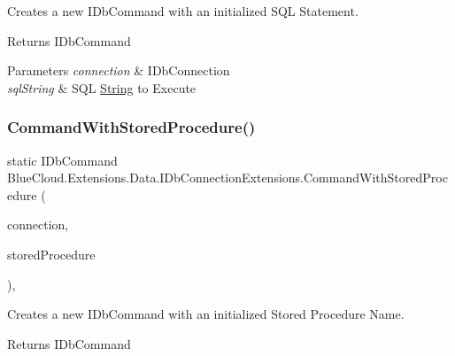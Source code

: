 Creates a new I\+Db\+Command with an initialized S\+QL Statement. 

\begin{DoxyReturn}{Returns}
I\+Db\+Command
\end{DoxyReturn}

\begin{DoxyParams}{Parameters}
{\em connection} & I\+Db\+Connection\\
\hline
{\em sql\+String} & S\+QL \mbox{\hyperlink{namespace_blue_cloud_1_1_extensions_1_1_string}{String}} to Execute\\
\hline
\end{DoxyParams}
\mbox{\label{class_blue_cloud_1_1_extensions_1_1_data_1_1_i_db_connection_extensions_a3ab3a6435b37ddb3254ed1be83bb74c9}} 
\subsubsection{\texorpdfstring{Command\+With\+Stored\+Procedure()}{CommandWithStoredProcedure()}}
{\footnotesize\ttfamily static I\+Db\+Command Blue\+Cloud.\+Extensions.\+Data.\+I\+Db\+Connection\+Extensions.\+Command\+With\+Stored\+Procedure (\begin{DoxyParamCaption}\item[{this I\+Db\+Connection}]{connection,  }\item[{string}]{stored\+Procedure }\end{DoxyParamCaption})\hspace{0.3cm}{\ttfamily [inline]}, {\ttfamily [static]}}



Creates a new I\+Db\+Command with an initialized Stored Procedure Name. 

\begin{DoxyReturn}{Returns}
I\+Db\+Command
\end{DoxyReturn}

